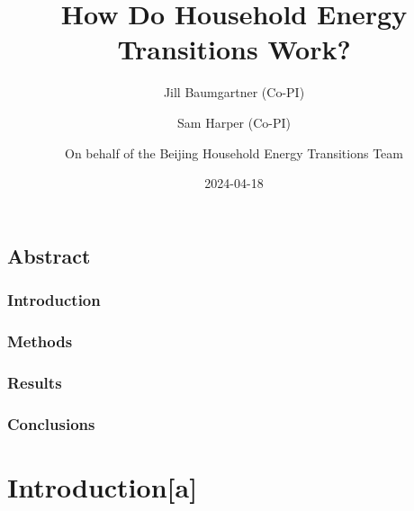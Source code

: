 \documentclass[
  letterpaper,
  DIV=11,
  numbers=noendperiod]{scrartcl}
\title{How Do Household Energy Transitions Work?}
\author{Jill Baumgartner (Co-PI) \and Sam Harper (Co-PI) \and On behalf
of the Beijing Household Energy Transitions Team}
\date{2024-04-18}
\renewcommand*\contentsname{Table of contents}
\newcommand\contentsname{Table of contents}
\begin{document}
\maketitle
\ifdefined\Shaded\renewenvironment{Shaded}{\begin{tcolorbox}[enhanced, breakable, interior hidden, borderline west={3pt}{0pt}{shadecolor}, sharp corners, boxrule=0pt, frame hidden]}{\end{tcolorbox}}\fi

\renewcommand*\contentsname{Table of contents}
{
\hypersetup{linkcolor=}
\setcounter{tocdepth}{3}
\tableofcontents
}
\hypertarget{abstract}{%
\subsection*{Abstract}\label{abstract}}

\hypertarget{introduction}{%
\subsubsection*{Introduction}\label{introduction}}

\hypertarget{methods}{%
\subsubsection*{Methods}\label{methods}}

\hypertarget{results}{%
\subsubsection*{Results}\label{results}}

\hypertarget{conclusions}{%
\subsubsection*{Conclusions}\label{conclusions}}

\hypertarget{introductiona}{%
\section{Introduction{[}a{]}}\label{introductiona}}
\end{document}
